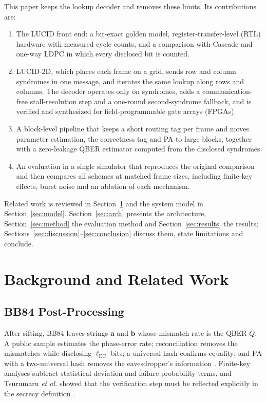 \documentclass[conference]{IEEEtran}
\begin{document}
This paper keeps the lookup decoder and removes these limits. Its contributions are:
\begin{enumerate}
\item The LUCID front end: a bit-exact golden model, register-transfer-level (RTL) hardware with measured cycle counts, and a comparison with Cascade and one-way LDPC in which every disclosed bit is counted.
\item LUCID-2D, which places each frame on a grid, sends row and column syndromes in one message, and iterates the same lookup along rows and columns. The decoder operates only on syndromes, adds a communication-free stall-resolution step and a one-round second-syndrome fallback, and is verified and synthesized for field-programmable gate arrays (FPGAs).
\item A block-level pipeline that keeps a short routing tag per frame and moves parameter estimation, the correctness tag and PA to large blocks, together with a zero-leakage QBER estimator computed from the disclosed syndromes.
\item An evaluation in a single simulator that reproduces the original comparison and then compares all schemes at matched frame sizes, including finite-key effects, burst noise and an ablation of each mechanism.
\end{enumerate}

Related work is reviewed in Section~\ref{sec:related} and the system model in Section~\ref{sec:model}. Section~\ref{sec:arch} presents the architecture, Section~\ref{sec:method} the evaluation method and Section~\ref{sec:results} the results; Sections~\ref{sec:discussion}--\ref{sec:conclusion} discuss them, state limitations and conclude.

\section{Background and Related Work}\label{sec:related}
\subsection{BB84 Post-Processing}
After sifting, BB84 \cite{bb84} leaves strings $\mathbf{a}$ and $\mathbf{b}$ whose mismatch rate is the QBER $Q$. A public sample estimates the phase-error rate; reconciliation removes the mismatches while disclosing $\ell_{\mathrm{EC}}$ bits; a universal hash \cite{carterwegman1979,krawczyk1994} confirms equality; and PA with a two-universal hash removes the eavesdropper's information \cite{bennett1995,renner2008,shorpreskill2000}. Finite-key analyses \cite{tomamichel2012,lim2014} subtract statistical-deviation and failure-probability terms, and Tsurumaru \textit{et al.} showed that the verification step must be reflected explicitly in the secrecy definition \cite{tsurumaru2025}.
\end{document}
